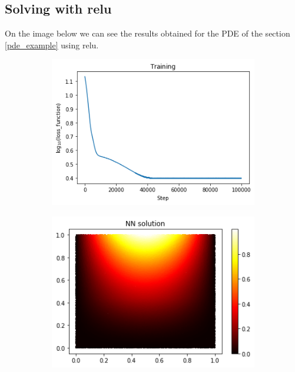 \subsection{Solving with relu}
On the image below we can see the results obtained for the PDE of the section \ref{pde_example} using relu.
\vspace{-0.45cm}
\begin{figure}[H]
\begin{subfigure}{.45\textwidth}
    \centering
    \includegraphics[width=.8\linewidth]{images/NN_Jax_PDE8_files_relu/NN_Jax_PDE8_18_1.png}
    \label{fig:sub1}
\end{subfigure}%
\begin{subfigure}{0.45\textwidth}
    \centering
    \includegraphics[width=0.8\linewidth]{images/NN_Jax_PDE8_files_relu/NN_Jax_PDE8_20_0.png}
    \label{fig:sub2}
\end{subfigure}
\newline
\begin{subfigure}{.45\textwidth}
    \centering

\end{subfigure}
\end{figure}
